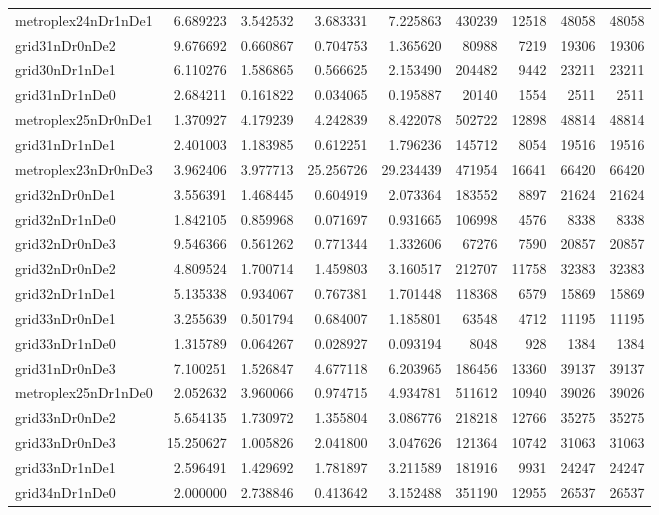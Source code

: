 \begin{longtable}{|l|r|r|r|r|r|r|r|r|}
metroplex24nDr1nDe1 & 6.689223 & 3.542532 & 3.683331 & 7.225863 & 430239 & 12518 & 48058 & 48058 \\
grid31nDr0nDe2 & 9.676692 & 0.660867 & 0.704753 & 1.365620 & 80988 & 7219 & 19306 & 19306 \\
grid30nDr1nDe1 & 6.110276 & 1.586865 & 0.566625 & 2.153490 & 204482 & 9442 & 23211 & 23211 \\
grid31nDr1nDe0 & 2.684211 & 0.161822 & 0.034065 & 0.195887 & 20140 & 1554 & 2511 & 2511 \\
metroplex25nDr0nDe1 & 1.370927 & 4.179239 & 4.242839 & 8.422078 & 502722 & 12898 & 48814 & 48814 \\
grid31nDr1nDe1 & 2.401003 & 1.183985 & 0.612251 & 1.796236 & 145712 & 8054 & 19516 & 19516 \\
metroplex23nDr0nDe3 & 3.962406 & 3.977713 & 25.256726 & 29.234439 & 471954 & 16641 & 66420 & 66420 \\
grid32nDr0nDe1 & 3.556391 & 1.468445 & 0.604919 & 2.073364 & 183552 & 8897 & 21624 & 21624 \\
grid32nDr1nDe0 & 1.842105 & 0.859968 & 0.071697 & 0.931665 & 106998 & 4576 & 8338 & 8338 \\
grid32nDr0nDe3 & 9.546366 & 0.561262 & 0.771344 & 1.332606 & 67276 & 7590 & 20857 & 20857 \\
grid32nDr0nDe2 & 4.809524 & 1.700714 & 1.459803 & 3.160517 & 212707 & 11758 & 32383 & 32383 \\
grid32nDr1nDe1 & 5.135338 & 0.934067 & 0.767381 & 1.701448 & 118368 & 6579 & 15869 & 15869 \\
grid33nDr0nDe1 & 3.255639 & 0.501794 & 0.684007 & 1.185801 & 63548 & 4712 & 11195 & 11195 \\
grid33nDr1nDe0 & 1.315789 & 0.064267 & 0.028927 & 0.093194 & 8048 & 928 & 1384 & 1384 \\
grid31nDr0nDe3 & 7.100251 & 1.526847 & 4.677118 & 6.203965 & 186456 & 13360 & 39137 & 39137 \\
metroplex25nDr1nDe0 & 2.052632 & 3.960066 & 0.974715 & 4.934781 & 511612 & 10940 & 39026 & 39026 \\
grid33nDr0nDe2 & 5.654135 & 1.730972 & 1.355804 & 3.086776 & 218218 & 12766 & 35275 & 35275 \\
grid33nDr0nDe3 & 15.250627 & 1.005826 & 2.041800 & 3.047626 & 121364 & 10742 & 31063 & 31063 \\
grid33nDr1nDe1 & 2.596491 & 1.429692 & 1.781897 & 3.211589 & 181916 & 9931 & 24247 & 24247 \\
grid34nDr1nDe0 & 2.000000 & 2.738846 & 0.413642 & 3.152488 & 351190 & 12955 & 26537 & 26537 \\

\end{longtable}
